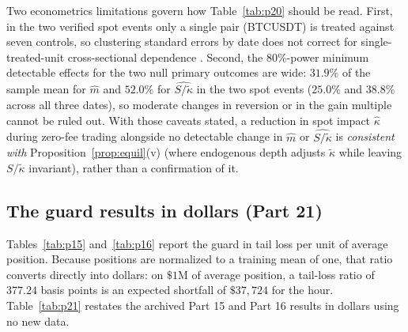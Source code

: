 \documentclass[12pt]{article}
\theoremstyle{definition}
\theoremstyle{remark}
\begin{document}
Two econometrics limitations govern how Table~\ref{tab:p20} should be read. First, in the two verified spot events only a single pair (BTCUSDT) is treated against seven controls, so clustering standard errors by date does not correct for single-treated-unit cross-sectional dependence \citep{conley2011}. Second, the 80\%-power minimum detectable effects for the two null primary outcomes are wide: $31.9\%$ of the sample mean for $\hat m$ and $52.0\%$ for $\widehat{S/\tilde\kappa}$ in the two spot events ($25.0\%$ and $38.8\%$ across all three dates), so moderate changes in reversion or in the gain multiple cannot be ruled out. With those caveats stated, a reduction in spot impact $\hat\kappa$ during zero-fee trading alongside no detectable change in $\hat m$ or $\widehat{S/\tilde\kappa}$ is \emph{consistent with} Proposition~\ref{prop:equil}(v) (where endogenous depth adjusts $\tilde\kappa$ while leaving $S/\tilde\kappa$ invariant), rather than a confirmation of it.

\subsection{The guard results in dollars (Part 21)}\label{sec:p21}
Tables~\ref{tab:p15} and~\ref{tab:p16} report the guard in tail loss per unit of average position. Because positions are normalized to a training mean of one, that ratio converts directly into dollars: on $\$1$M of average position, a tail-loss ratio of $377.24$ basis points is an expected shortfall of $\$37{,}724$ for the hour. Table~\ref{tab:p21} restates the archived Part 15 and Part 16 results in dollars using no new data.
\end{document}
